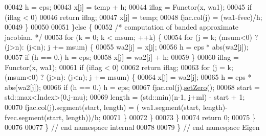 \begin{DoxyCode}
00042                 h = eps;
00043             x[j] = temp + h;
00044             iflag = Functor(x, wa1);
00045             \textcolor{keywordflow}{if} (iflag < 0)
00046                 \textcolor{keywordflow}{return} iflag;
00047             x[j] = temp;
00048             fjac.col(j) = (wa1-fvec)/h;
00049         \}
00050 
00051     \}\textcolor{keywordflow}{else} \{
00052         \textcolor{comment}{/* computation of banded approximate jacobian. */}
00053         \textcolor{keywordflow}{for} (k = 0; k < msum; ++k) \{
00054             \textcolor{keywordflow}{for} (j = k; (msum<0) ? (j>n): (j<n); j += msum) \{
00055                 wa2[j] = x[j];
00056                 h = eps * abs(wa2[j]);
00057                 \textcolor{keywordflow}{if} (h == 0.) h = eps;
00058                 x[j] = wa2[j] + h;
00059             \}
00060             iflag = Functor(x, wa1);
00061             \textcolor{keywordflow}{if} (iflag < 0)
00062                 \textcolor{keywordflow}{return} iflag;
00063             \textcolor{keywordflow}{for} (j = k; (msum<0) ? (j>n): (j<n); j += msum) \{
00064                 x[j] = wa2[j];
00065                 h = eps * abs(wa2[j]);
00066                 \textcolor{keywordflow}{if} (h == 0.) h = eps;
00067                 fjac.col(j).\hyperlink{class_eigen_1_1_plain_object_base_ac21ad5f989f320e46958b75ac8d9a1da}{setZero}();
00068                 start = std::max<Index>(0,j-mu);
00069                 length = (std::min)(n-1, j+ml) - start + 1;
00070                 fjac.col(j).segment(start, length) = ( wa1.segment(start, length)-fvec.segment(start, 
      length))/h;
00071             \}
00072         \}
00073     \}
00074     \textcolor{keywordflow}{return} 0;
00075 \}
00076 
00077 \} \textcolor{comment}{// end namespace internal}
00078 
00079 \} \textcolor{comment}{// end namespace Eigen}
\end{DoxyCode}
